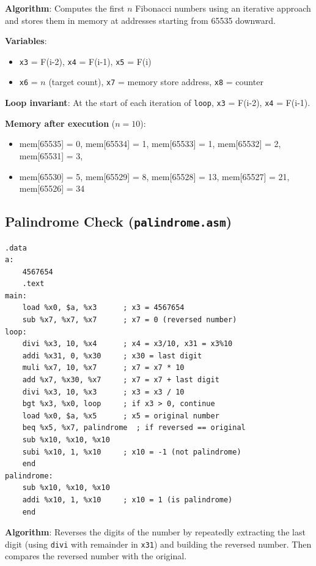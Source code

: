 \documentclass[12pt,a4paper]{article}
\begin{document}
\textbf{Algorithm}: Computes the first $n$ Fibonacci numbers using an iterative approach and stores them in memory at addresses starting from 65535 downward.

\textbf{Variables}:
\begin{itemize}
    \item \texttt{x3} = F(i-2), \texttt{x4} = F(i-1), \texttt{x5} = F(i)
    \item \texttt{x6} = $n$ (target count), \texttt{x7} = memory store address, \texttt{x8} = counter
\end{itemize}

\textbf{Loop invariant}: At the start of each iteration of \texttt{loop}, \texttt{x3} = F(i-2), \texttt{x4} = F(i-1).

\textbf{Memory after execution} ($n = 10$):
\begin{itemize}
    \item mem[65535] = 0, mem[65534] = 1, mem[65533] = 1, mem[65532] = 2, mem[65531] = 3,
    \item mem[65530] = 5, mem[65529] = 8, mem[65528] = 13, mem[65527] = 21, mem[65526] = 34
\end{itemize}

\subsection{Palindrome Check (\texttt{palindrome.asm})}

\begin{lstlisting}[style=asmstyle, caption={palindrome.asm}]
.data
a:
    4567654
    .text
main:
    load %x0, $a, %x3      ; x3 = 4567654
    sub %x7, %x7, %x7      ; x7 = 0 (reversed number)
loop:
    divi %x3, 10, %x4      ; x4 = x3/10, x31 = x3%10
    addi %x31, 0, %x30     ; x30 = last digit
    muli %x7, 10, %x7      ; x7 = x7 * 10
    add %x7, %x30, %x7     ; x7 = x7 + last digit
    divi %x3, 10, %x3      ; x3 = x3 / 10
    bgt %x3, %x0, loop     ; if x3 > 0, continue
    load %x0, $a, %x5      ; x5 = original number
    beq %x5, %x7, palindrome  ; if reversed == original
    sub %x10, %x10, %x10
    subi %x10, 1, %x10     ; x10 = -1 (not palindrome)
    end
palindrome:
    sub %x10, %x10, %x10
    addi %x10, 1, %x10     ; x10 = 1 (is palindrome)
    end
\end{lstlisting}

\textbf{Algorithm}: Reverses the digits of the number by repeatedly extracting the last digit (using \texttt{divi} with remainder in \texttt{x31}) and building the reversed number. Then compares the reversed number with the original.
\end{document}
